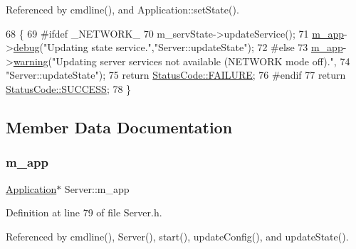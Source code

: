 Referenced by cmdline(), and Application\+::set\+State().


\begin{DoxyCode}
68                                  \{
69 \textcolor{preprocessor}{#ifdef \_NETWORK\_}
70   m\_servState->updateService();
71   \hyperlink{classServer_ae1c25dc357c4a1145289c747fddaa251}{m\_app}->\hyperlink{classObject_aac010553f022165573714b7014a15f0d}{debug}(\textcolor{stringliteral}{"Updating state service."},\textcolor{stringliteral}{"Server::updateState"}); 
72 \textcolor{preprocessor}{#else}
73   \hyperlink{classServer_ae1c25dc357c4a1145289c747fddaa251}{m\_app}->\hyperlink{classObject_a65cd4fda577711660821fd2cd5a3b4c9}{warning}(\textcolor{stringliteral}{"Updating server services not available (NETWORK mode off)."},
74                  \textcolor{stringliteral}{"Server::updateState"}); 
75   \textcolor{keywordflow}{return} \hyperlink{classStatusCode_a6f565cbeadc76d14c72f047e5e85eb4ba3da73d4c469762eb9d3c960368252b26}{StatusCode::FAILURE};
76 \textcolor{preprocessor}{#endif}
77   \textcolor{keywordflow}{return} \hyperlink{classStatusCode_a6f565cbeadc76d14c72f047e5e85eb4badd0da38d3ba0d922efd1f4619bc37ad8}{StatusCode::SUCCESS};
78 \}
\end{DoxyCode}


\subsection{Member Data Documentation}
\mbox{\label{classServer_ae1c25dc357c4a1145289c747fddaa251}} 
\subsubsection{\texorpdfstring{m\+\_\+app}{m\_app}}
{\footnotesize\ttfamily \hyperlink{classApplication}{Application}$\ast$ Server\+::m\+\_\+app\hspace{0.3cm}{\ttfamily [private]}}



Definition at line 79 of file Server.\+h.



Referenced by cmdline(), Server(), start(), update\+Config(), and update\+State().

\mbox{\label{classServer_ae991d55181bff0552a34278ea9f76735}} 
